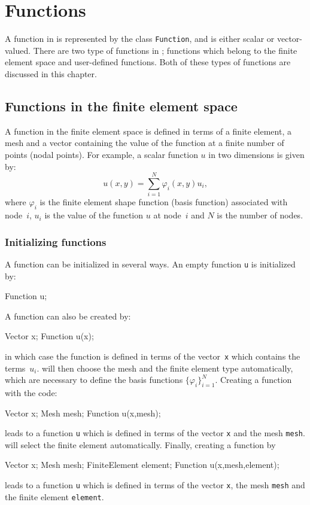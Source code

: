 \chapter{Functions}


A function in \dolfin{} is represented by the class \texttt{Function}, and
is either scalar or vector-valued. There are two type of functions in \dolfin{};
functions which belong to the finite element space and user-defined functions.
Both of these types of functions are discussed in this chapter. 



\section{Functions in the finite element space}
%
A function in the finite element space is defined in terms of a finite
element, a mesh and a vector containing the value of the function at a
finite number of points (nodal points). For example, a scalar function $u$ in
two dimensions is given by:
\begin{equation}
  u(x,y) = \sum_{i=1}^{N} \varphi_{i}(x,y) u_{i},
\end{equation}
where $\varphi_{i}$ is the finite element shape function (basis function)
associated with node~$i$, $u_{i}$ is the value of the function $u$ at node~$i$
and $N$ is the number of nodes. 

\subsection{Initializing functions}
A function can be initialized in several ways. An empty function \texttt{u}
is initialized by:
\begin{code}
  Function u;
\end{code}
A function can also be created by:
\begin{code}
  Vector x;
  Function u(x);
\end{code}
in which case the function is defined in terms of the vector~\texttt{x} which
contains the terms~$u_{i}$. \dolfin{} will then choose the mesh and the finite
element type automatically, which are necessary to define the basis functions
$\{\varphi_{i}\}_{i=1}^{N}$. Creating a function with the code:
\begin{code}
  Vector x;
  Mesh mesh;
  Function u(x,mesh);
\end{code}
leads to a function \texttt{u} which is defined in terms of the vector
\texttt{x} and the mesh \texttt{mesh}. \dolfin{} will select the finite element
automatically. Finally, creating a function by 
\begin{code}
  Vector x;
  Mesh mesh;
  FiniteElement element;
  Function u(x,mesh,element);
\end{code}
leads to a function \texttt{u} which is defined in terms of the vector
\texttt{x}, the mesh \texttt{mesh} and the finite element \texttt{element}.

